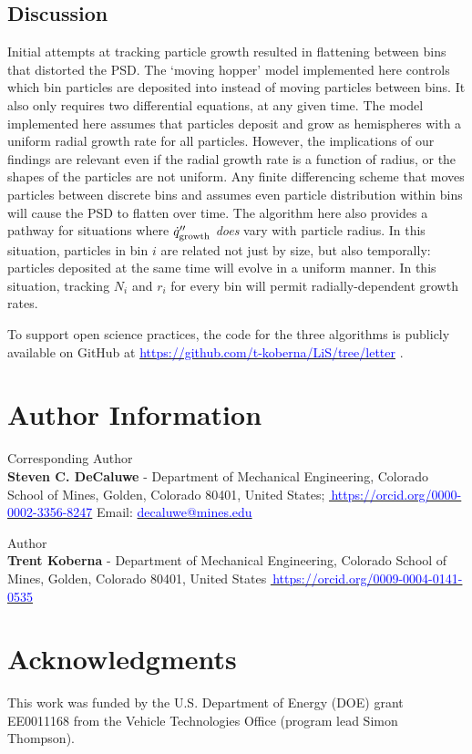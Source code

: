 \documentclass[final,3p,times,twocolumn, 12pt]{elsarticle}
\newcommand{\bluelink}[2]{%
  \href{#1}{\textcolor{blue}{#2}}%
}
\begin{document}
\subsection{Discussion}
Initial attempts at tracking particle growth resulted in flattening between bins that distorted the PSD. The `moving hopper' model implemented here controls which bin particles are deposited into instead of moving particles between bins. It also only requires two differential equations, at any given time. The model implemented here assumes that particles deposit and grow as hemispheres with a uniform radial growth rate for all particles. However, the implications of our findings are relevant even if the radial growth rate is a function of radius, or the shapes of the particles are not uniform. Any finite differencing scheme that moves particles between discrete bins and assumes even particle distribution within bins will cause the PSD to flatten over time.  The algorithm here also provides a pathway for situations where $\dot{q}^{\prime\prime}_{\rm growth}$ \emph{does} vary with particle radius. In this situation, particles in bin $i$ are related not just by size, but also temporally: particles deposited at the same time will evolve in a uniform manner.  In this situation, tracking $N_i$ and $r_i$ for every bin will permit radially-dependent growth rates.

To support open science practices, the code for the three algorithms is publicly available on GitHub at \bluelink{https://github.com/t-koberna/LiS/tree/letter}{https://github.com/t-koberna/LiS/tree/letter}. \\ 


\section{Author Information}
Corresponding Author \\
\textbf{Steven C. DeCaluwe} - Department of Mechanical Engineering, Colorado School of Mines, Golden, Colorado 80401, United States; \bluelink{https://orcid.org/0000-0002-3356-8247}{\orcidlink{0000-0002-3356-8247}\,https://orcid.org/0000-0002-3356-8247} Email: \bluelink{decaluwe@mines.edu}{decaluwe@mines.edu}

Author\\
\textbf{Trent Koberna} - Department of Mechanical Engineering, Colorado School of Mines, Golden, Colorado 80401, United States \bluelink{https://orcid.org/0009-0004-0141-0535}{\orcidlink{0000-0002-3356-8247}\,https://orcid.org/0009-0004-0141-0535} 
\section{Acknowledgments}
This work was funded by the U.S. Department of Energy (DOE) grant EE0011168 from the Vehicle Technologies Office (program lead Simon Thompson).


\end{document}
